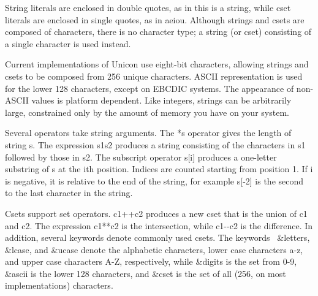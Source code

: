 String literals are enclosed in double quotes, as
in \textsf{{\textquotedbl}this is a string{\textquotedbl}}, while
cset literals are enclosed in single quotes, as in
\textsf{{\textquotesingle}aeiou{\textquotesingle}}. Although strings
and csets are composed of characters, there is no
character type; a string (or cset) consisting of a
single character is used instead.

Current implementations of Unicon use eight-bit characters, allowing
strings and csets to be composed from 256 unique characters.
ASCII representation is used for the lower 128 characters,
except on EBCDIC systems. The appearance of non-ASCII
values is platform dependent. Like integers, strings can be arbitrarily
large, constrained only by the amount of memory you have on your
system.

Several operators take string arguments. The \textsf{*s} operator gives the length
of string \textsf{s}. The expression \textsf{s1{\textbar}{\textbar}s2} produces a
string consisting of the characters in \textsf{s1} followed by those in
\textsf{s2}. The subscript operator
\textsf{s[i]} produces a one-letter
substring of \textsf{s} at the \textsf{i}th position.
Indices are counted starting from
position 1. If \textsf{i} is negative, it is relative to the end of the
string, for example \textsf{s[-2]} is the second to the last character
in the string.

Csets support set operators. \textsf{c1++c2}
produces a new cset that is the union of \textsf{c1} and \textsf{c2}.
The expression \textsf{c1**c2} is the
intersection, while \textsf{c1-{}-c2} is
the difference. In addition, several keywords denote commonly used
csets. The keywords \ \textsf{\&letters},
\textsf{\&lcase}, and \textsf{\&ucase} denote the alphabetic
characters, lower case characters a-z, and
upper case characters A-Z, respectively, while
\textsf{\&digits} is the set from 0-9,
\textsf{\&ascii} is the lower 128 characters, and
\textsf{\&cset} is the set of all (256,
on most implementations) characters.

